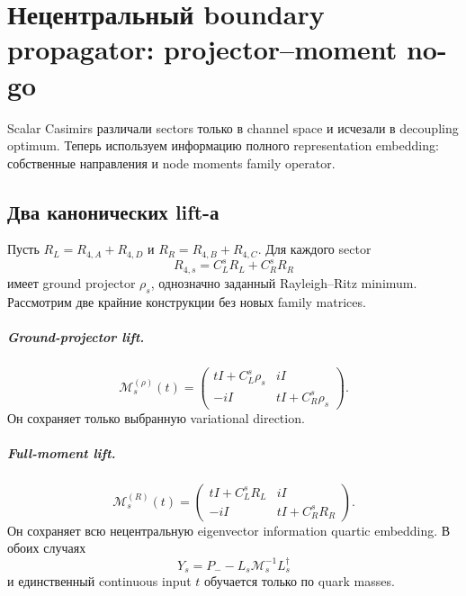 \chapter{Нецентральный boundary propagator: projector--moment no-go}

Scalar Casimirs различали sectors только в channel space и исчезали в
decoupling optimum. Теперь используем информацию полного representation
embedding: собственные направления и node moments family operator.

\section{Два канонических lift-а}

Пусть \(R_L=R_{4,A}+R_{4,D}\) и
\(R_R=R_{4,B}+R_{4,C}\). Для каждого sector
\begin{equation}
 R_{4,s}=C_L^sR_L+C_R^sR_R
\end{equation}
имеет ground projector \(\rho_s\), однозначно заданный Rayleigh--Ritz
minimum. Рассмотрим две крайние конструкции без новых family matrices.

\paragraph{Ground-projector lift.}
\begin{equation}
 \mathcal M_s^{(\rho)}(t)=
 \begin{pmatrix}
 tI+C_L^s\rho_s&iI\\
 -iI&tI+C_R^s\rho_s
 \end{pmatrix}.
\end{equation}
Он сохраняет только выбранную variational direction.

\paragraph{Full-moment lift.}
\begin{equation}
 \mathcal M_s^{(R)}(t)=
 \begin{pmatrix}
 tI+C_L^sR_L&iI\\
 -iI&tI+C_R^sR_R
 \end{pmatrix}.
\end{equation}
Он сохраняет всю нецентральную eigenvector information quartic embedding.
В обоих случаях
\begin{equation}
 Y_s=P_--L_s\mathcal M_s^{-1}L_s^\dagger
\end{equation}
и единственный continuous input \(t\) обучается только по quark masses.

